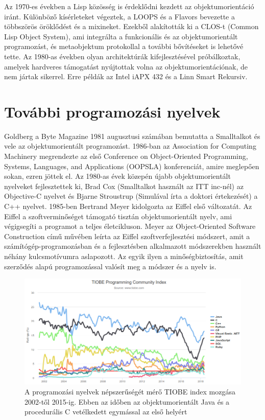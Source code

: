 \documentclass[]{thesis-ekf}
\theoremstyle{definition}
\begin{document}
	Az 1970-es években a Lisp közösség is érdeklődni kezdett az objektumorientáció iránt. Különböző kísérleteket végeztek, a LOOPS és a Flavors bevezette a többszörös öröklődést és a mixineket. Ezekből alakították ki a CLOS-t (Common Lisp Object System), ami integrálta a funkcionális és az objektumorientált programozást, és metaobjektum protokollal a további bővítéseket is lehetővé tette. Az 1980-as években olyan architektúrák kifejlesztésével próbálkoztak, amelyek hardveres támogatást nyújtottak volna az objektumorientációnak, de nem jártak sikerrel. Erre példák az Intel iAPX 432 és a Linn Smart Rekursiv.
	
	\section{További programozási nyelvek}
	
	Goldberg a Byte Magazine 1981 augusztusi számában bemutatta a Smalltalkot és vele az objektumorientált programozást. 1986-ban az Association for Computing Machinery megrendezte az első Conference on Object-Oriented Programming, Systems, Languages, and Applications (OOPSLA) konferenciát, amire meglepően sokan, ezren jöttek el. Az 1980-as évek közepén újabb objektumorientált nyelveket fejlesztettek ki, Brad Cox (Smalltalkot használt az ITT inc-nél) az Objective-C nyelvet és Bjarne Stroustrup (Simulával írta a doktori értekezését) a C++ nyelvet. 1985-ben Bertrand Meyer kidolgozta az Eiffel első változatát. Az Eiffel a szoftverminőséget támogató tisztán objektumorientált nyelv, ami végigsegíti a programot a teljes életcikluson. Meyer az Object-Oriented Software Construction című művében leírta az Eiffel szoftverfejlesztési módszert, amit a számítógép-programozásban és a fejlesztésben alkalmazott módszerekben használt néhány kulcsmotívumra aslapozott. Az egyik ilyen a minőségbiztosítás, amit szerződés alapú programozással valósít meg a módszer és a nyelv is.
	
	\begin{figure} [!ht]
		\centering
		\includegraphics[width=12cm]{Tiobeindex}
		\caption{A programozási nyelvek népszerűségét mérő TIOBE index mozgása 2002-től 2015-ig. Ebben az időben az objektumorientált Java és a procedurális C vetélkedett egymással az első helyért} 
		\label{fig:TIOBE}
	\end{figure}
	
\end{document}
